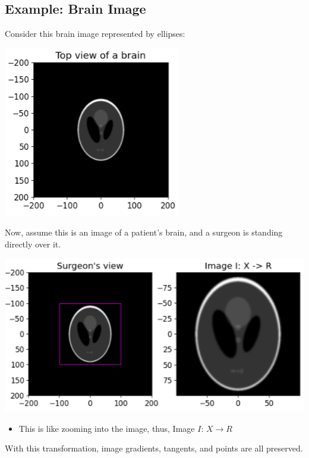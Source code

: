 \documentclass[10pt]{article}
\begin{document}
\subsection*{Example: Brain Image}
Consider this brain image represented by ellipses:
\begin{center}
    \includegraphics*[scale=1]{W2_1.png}
\end{center}
Now, assume this is an image of a patient's brain, and a surgeon is standing directly over it.
\begin{center}
    \includegraphics*[scale=1]{W2_2.png}
\end{center}
\begin{itemize}
    \item This is like zooming into the image, thus, Image $I$: $X \rightarrow R$
\end{itemize}
With this transformation, image gradients, tangents, and points are all preserved.
\end{document}
